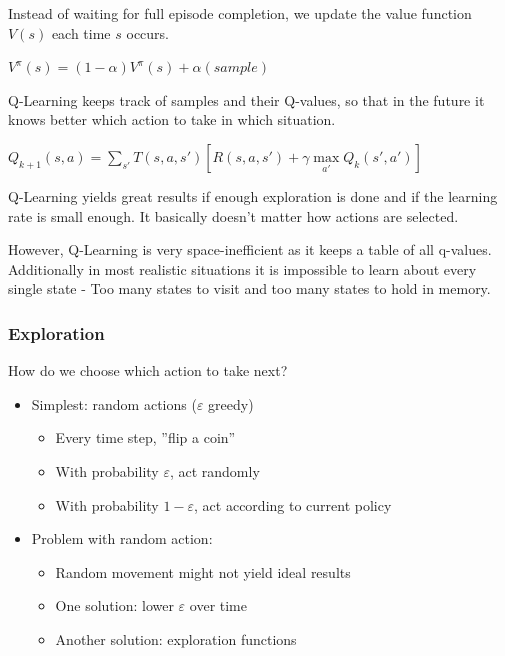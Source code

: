 \documentclass[
../../EiKI_Summary.tex,
]
{subfiles}
\begin{document}
\begin{defbox}
    Instead of waiting for full episode completion, we update the value function $V(s)$ each time $s$ occurs. 

    \begin{csmb*}
        $V^\pi(s) = (1 - \alpha)V^\pi(s) + \alpha(sample)$
    \end{csmb*}
\end{defbox}

\begin{defbox}
    [Q-Learning]
    Q-Learning keeps track of samples and their Q-values, so that in the future it knows better which action to take in which situation.

    \begin{csmb*}
        $Q_{k+1}(s,a) = \sum_{s'} T(s,a,s') \left[R(s,a,s') + \gamma \underset{a'}{\max}Q_k(s',a')\right]$
    \end{csmb*}

    Q-Learning yields great results if enough exploration is done and if the learning rate is small enough. It basically doesn't matter how actions are selected.

    However, Q-Learning is very space-inefficient as it keeps a table of all q-values. Additionally in most realistic situations it is impossible to learn about every single state - Too many states to visit and too many states to hold in memory.
\end{defbox}

\subsubsection{Exploration}
How do we choose which action to take next?
\begin{itemize}
    \item Simplest: random actions ($\varepsilon$ greedy)
    \begin{itemize}
        \item Every time step, ''flip a coin''
        \item With probability $\varepsilon$, act randomly
        \item With probability $1-\varepsilon$, act according to current policy
    \end{itemize}
    \item Problem with random action:
    \begin{itemize}
        \item Random movement might not yield ideal results
        \item One solution: lower $\varepsilon$ over time
        \item Another solution: exploration functions
    \end{itemize}
\end{itemize}
\end{document}
